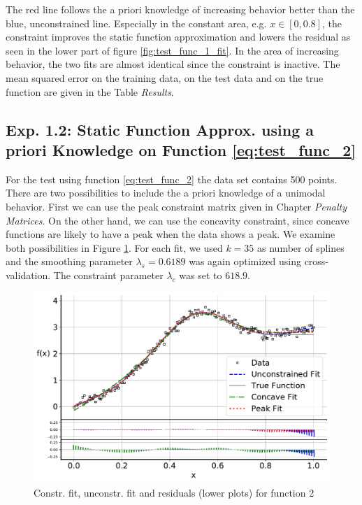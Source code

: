 \documentclass[10pt,a4paper]{article}
\begin{document}
The red line follows the a priori knowledge of increasing behavior better than the blue, unconstrained line. Especially in the constant area, e.g. $x \in  [0, 0.8]$, the constraint improves the static function approximation and lowers the residual as seen in the lower part of figure \ref{fig:test_func_1_fit}. In the area of increasing behavior, the two fits are almost identical since the constraint is inactive. The mean squared error on the training data, on the test data and on the true function are given in the Table \emph{Results}.

\subsection{Exp. 1.2: Static Function Approx. using a priori Knowledge on Function \ref{eq:test_func_2}}

For the test using function \ref{eq:test_func_2} the data set contains 500 points. There are two possibilities to include the a priori knowledge of a unimodal behavior. First we can use the peak constraint matrix given in Chapter \emph{Penalty Matrices}. On the other hand, we can use the concavity constraint, since concave functions are likely to have a peak when the data shows a peak. We examine both possibilities in Figure \ref{fig:test_func_2_fit}. For each fit, we used $k=35$ as number of splines and the smoothing parameter $\lambda_s=0.6189$ was again optimized using cross-validation. The constraint parameter $\lambda_c$ was set to $618.9$.

\begin{figure}[H]
	\centering
	\includegraphics[width=\columnwidth]{../thesisplots/exp_peak_fit.pdf}
	\caption{Constr. fit, unconstr. fit and residuals (lower plots) for function 2}
	\label{fig:test_func_2_fit}
\end{figure}
 
\end{document}
